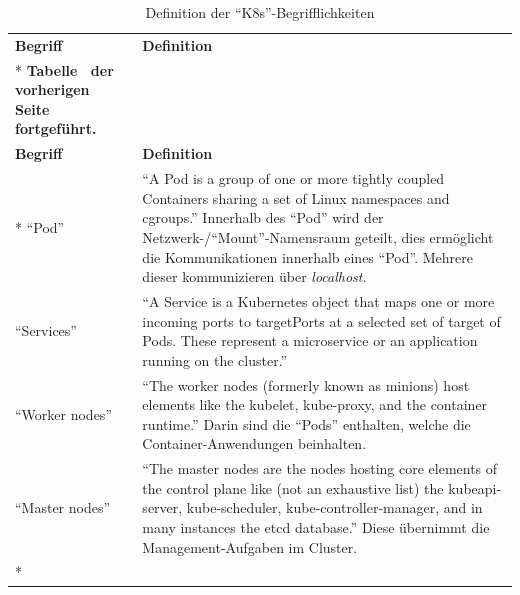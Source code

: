 \begin{longtable}[c]{@{}lp{12.0cm}@{}}
	\toprule[1.5pt]
	\textbf{Begriff} & \textbf{Definition} \\* \midrule
	\endfirsthead
	\multicolumn{2}{c}%
	{{\bfseries Tabelle \thetable\ der vorherigen Seite fortgeführt.}} \\
	\toprule
	\textbf{Begriff} & \textbf{Definition} \\* \midrule
	\endhead
	\bottomrule
	\endfoot
	\endlastfoot
	\enquote{Pod}              & \enquote{A Pod is a group of one or more tightly coupled Containers sharing a set of Linux namespaces and cgroups.} Innerhalb des \enquote{Pod} wird der Netzwerk-/\enquote{Mount}-Namensraum geteilt, dies ermöglicht die Kommunikationen innerhalb eines \enquote{Pod}. Mehrere dieser kommunizieren über \textit{localhost}. \\
	\enquote{Services}         & \enquote{A Service is a Kubernetes object that maps one or more incoming ports to targetPorts at a selected set of target of Pods. These represent a microservice or an application running on the cluster.} \\
	\enquote{Worker nodes}     & \enquote{The worker nodes (formerly known as minions) host elements like the kubelet, kube-proxy, and the container runtime.} Darin sind die \enquote{Pods} enthalten, welche die Container-Anwendungen beinhalten. \\
	\enquote{Master nodes}     & \enquote{The master nodes are the nodes hosting core elements of the control plane like (not an exhaustive list) the kubeapi-server, kube-scheduler, kube-controller-manager, and in many	instances the etcd database.} Diese übernimmt die Management-Aufgaben im Cluster. \\* \bottomrule
	
		
	\caption{Definition der \enquote{\ac{K8s}}-Begrifflichkeiten}\label{tab:definitionenK8s}\\
\end{longtable}


